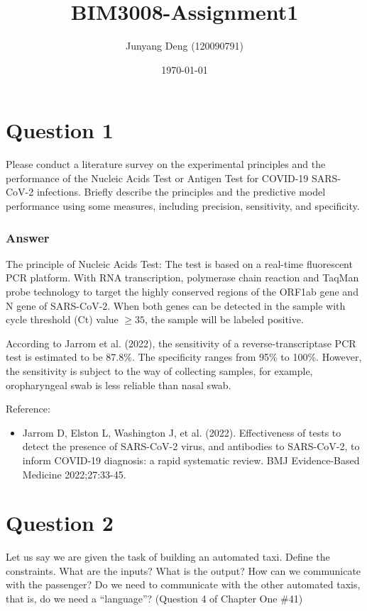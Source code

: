 \documentclass{article}
\title{BIM3008-Assignment1}
\author{Junyang Deng (120090791)}
\date{\today}
\begin{document}
 
\maketitle
\section*{Question 1}
Please conduct a literature survey on the experimental principles and the performance of the Nucleic Acids Test or Antigen Test for COVID-19 SARS-CoV-2 infections. Briefly describe the principles and the predictive model performance using some measures, including precision, sensitivity, and specificity.
\subsubsection*{Answer}
The principle of Nucleic Acids Test: The test is based on a real-time fluorescent PCR platform. With RNA transcription, polymerase chain reaction and TaqMan probe technology to target the highly conserved regions of the ORF1ab gene and N gene of SARS-CoV-2. When both genes can be detected in the sample with cycle threshold (Ct) value $\geq 35$, the sample will be labeled positive.

According to Jarrom et al. (2022), the sensitivity of a reverse-transcriptase PCR test is estimated to be 87.8\%.  The specificity ranges from 95\% to 100\%. However, the sensitivity is subject to the way of collecting samples, for example, oropharyngeal swab is less reliable than nasal swab.

Reference:
\begin{itemize}
    \item Jarrom D, Elston L, Washington J, et al. (2022). Effectiveness of tests to detect the presence of SARS-CoV-2 virus, and antibodies to SARS-CoV-2, to inform COVID-19 diagnosis: a rapid systematic review. BMJ Evidence-Based Medicine 2022;27:33-45.
\end{itemize}





\section*{Question 2}
Let us say we are given the task of building an automated taxi. Define the constraints. What are the inputs? What is the output? How can we communicate with the passenger? Do we need to communicate with the other automated taxis, that is, do we need a “language”? (Question 4 of Chapter One \#41)
\end{document}
